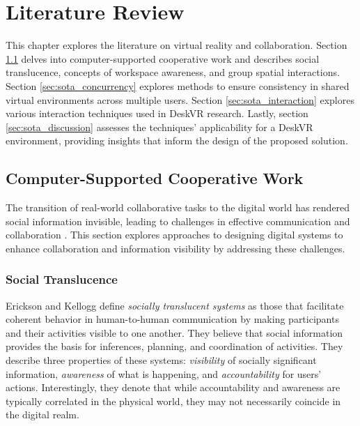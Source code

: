 \chapter{Literature Review} \label{chap:sota}

    This chapter explores the literature on virtual reality and collaboration. Section \ref{sec:sota_social} delves into computer-supported cooperative work and describes social translucence, concepts of workspace awareness, and group spatial interactions. Section \ref{sec:sota_concurrency} explores methods to ensure consistency in shared virtual environments across multiple users. Section \ref{sec:sota_interaction} explores various interaction techniques used in DeskVR research. Lastly, section \ref{sec:sota_discussion} assesses the techniques' applicability for a DeskVR environment, providing insights that inform the design of the proposed solution.
    
\section{Computer-Supported Cooperative Work} \label{sec:sota_social}

    The transition of real-world collaborative tasks to the digital world has rendered social information invisible, leading to challenges in effective communication and collaboration \cite{ericksonSocialTranslucenceApproach2000}. This section explores approaches to designing digital systems to enhance collaboration and information visibility by addressing these challenges.

    \subsection{Social Translucence} \label{sec:sota_social_1}

    Erickson and Kellogg \cite{ericksonSocialTranslucenceApproach2000} define \textit{socially translucent systems} as those that facilitate coherent behavior in human-to-human communication by making participants and their activities visible to one another. They believe that social information provides the basis for inferences, planning, and coordination of activities. They describe three properties of these systems: \textit{visibility} of socially significant information, \textit{awareness} of what is happening, and \textit{accountability} for users' actions. Interestingly, they denote that while accountability and awareness are typically correlated in the physical world, they may not necessarily coincide in the digital realm.

